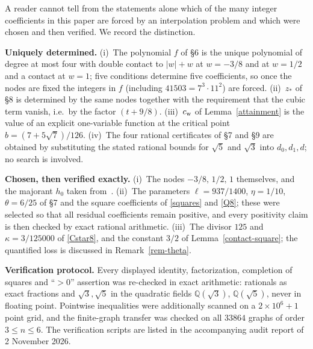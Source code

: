 
A reader cannot tell from the statements alone which of the many integer
coefficients in this paper are forced by an interpolation problem and which
were chosen and then verified. We record the distinction.

\textbf{Uniquely determined.}
(i)~The polynomial $f$ of \S6 is the unique polynomial of degree at most
four with double contact to $|w|+w$ at $w=-3/8$ and at $w=1/2$ and a contact
at $w=1$; five conditions determine five coefficients, so once the nodes are
fixed the integers in $f$ (including $41503=7^3\cdot11^2$) are forced.
(ii)~$z_*$ of \S8 is determined by the same nodes together with the
requirement that the cubic term vanish, i.e.\ by the factor $(t+9/8)$.
(iii)~$c_{\mathrm{w}}$ of Lemma~\ref{attainment} is the value of an explicit
one-variable function at the critical point $b=(7+5\sqrt7)/126$.
(iv)~The four rational certificates of \S7 and \S9 are obtained by
substituting the stated rational bounds for $\sqrt5$ and $\sqrt3$ into
$d_0,d_1,d$; no search is involved.

\textbf{Chosen, then verified exactly.}
(i)~The nodes $-3/8,\,1/2,\,1$ themselves, and the majorant $h_0$ taken
from~\cite[Lemma 4.4]{STW}.
(ii)~The parameters $\ell=937/1400$, $\eta=1/10$, $\theta=6/25$ of \S7 and
the square coefficients of \eqref{squares} and \eqref{Q8}; these were
selected so that all residual coefficients remain positive, and every
positivity claim is then checked by exact rational arithmetic.
(iii)~The divisor $125$ and $\kappa=3/125000$ of \eqref{Cstar8}, and the
constant $3/2$ of Lemma~\ref{contact-square}; the quantified loss is
discussed in Remark~\ref{rem-theta}.

\textbf{Verification protocol.} Every displayed identity, factorization,
completion of squares and ``$>0$'' assertion was re-checked in exact
arithmetic: rationals as exact fractions and $\sqrt3,\sqrt5$ in the
quadratic fields $\mathbb Q(\sqrt3)$, $\mathbb Q(\sqrt5)$, never in floating
point. Pointwise inequalities were additionally scanned on a
$2\times10^6+1$ point grid, and the finite-graph transfer was checked on all
$33864$ graphs of order $3\le n\le6$. The verification scripts are listed in
the accompanying audit report of 2 November 2026.
